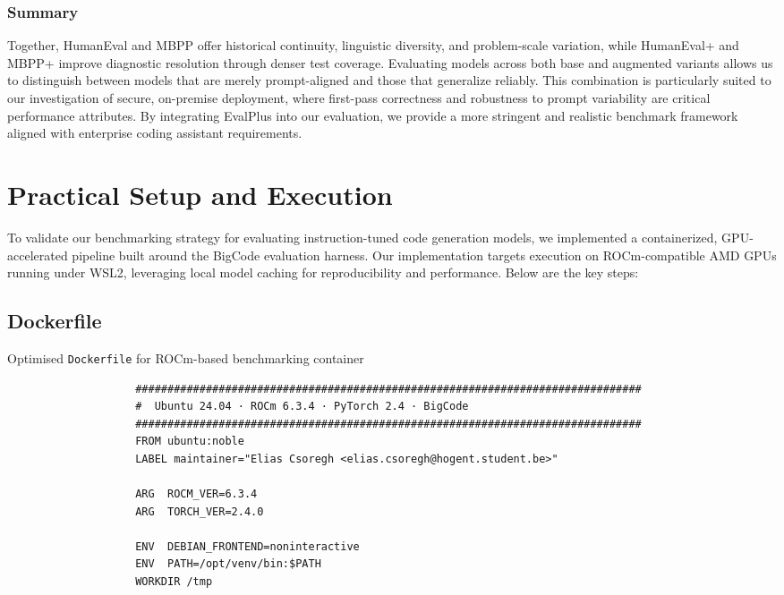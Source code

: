\subsubsection*{Summary}
Together, HumanEval and \gls{MBPP} offer historical continuity, linguistic diversity, and problem-scale variation, while HumanEval+ and \gls{MBPP}+ improve diagnostic resolution through denser test coverage. Evaluating models across both base and augmented variants allows us to distinguish between models that are merely prompt-aligned and those that generalize reliably. This combination is particularly suited to our investigation of secure, on-premise deployment, where first-pass correctness and robustness to prompt variability are critical performance attributes. By integrating EvalPlus into our evaluation, we provide a more stringent and realistic benchmark framework aligned with enterprise coding assistant requirements.

\clearpage

\section{Practical Setup and Execution}

To validate our benchmarking strategy for evaluating instruction-tuned code generation models, we implemented a containerized, GPU-accelerated pipeline built around the BigCode evaluation harness. Our implementation targets execution on ROCm-compatible AMD GPUs running under WSL2, leveraging local model caching for reproducibility and performance. Below are the key steps:

\subsection{Dockerfile}

\begin{minipage}{\textwidth}
	\captionsetup{type=listing}
	\caption{Optimised \texttt{Dockerfile} for ROCm-based benchmarking container}
	\label{lst:dockerfile}

	\begin{verbatim}
                    ###############################################################################
                    #  Ubuntu 24.04 · ROCm 6.3.4 · PyTorch 2.4 · BigCode
                    ###############################################################################
                    FROM ubuntu:noble
                    LABEL maintainer="Elias Csoregh <elias.csoregh@hogent.student.be>"

                    ARG  ROCM_VER=6.3.4
                    ARG  TORCH_VER=2.4.0

                    ENV  DEBIAN_FRONTEND=noninteractive
                    ENV  PATH=/opt/venv/bin:$PATH
                    WORKDIR /tmp

    \end{verbatim}
\end{minipage}

